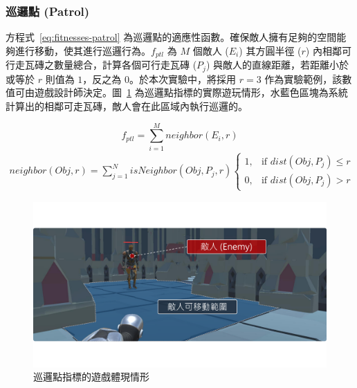 

\subsubsection{巡邏點 (Patrol)}
\label{sssec:method-segments-fitnesses-patrol}

方程式~\ref{eq:fitnesses-patrol} 為巡邏點的適應性函數。確保敵人擁有足夠的空間能夠進行移動，使其進行巡邏行為。$f_{ptl}$ 為 $M$ 個敵人 ($E_{i}$) 其方圓半徑 ($r$) 內相鄰可行走瓦磚之數量總合，計算各個可行走瓦磚 ($P_{j}$) 與敵人的直線距離，若距離小於或等於 $r$ 則值為 $1$，反之為 $0$。於本次實驗中，將採用 $r=3$ 作為實驗範例，該數值可由遊戲設計師決定。圖~\ref{fig:fitnesses-patrol-gameplay} 為巡邏點指標的實際遊玩情形，水藍色區塊為系統計算出的相鄰可走瓦磚，敵人會在此區域內執行巡邏的。

\begin{equation}
    \label{eq:fitnesses-patrol}
    f_{ptl} = \sum_{i=1}^{M} neighbor(E_i, r)
\end{equation}
\begin{gather*}
    neighbor(Obj, r) = \sum_{j=1}^{N} isNeighbor(Obj, P_{j}, r)
      \begin{cases}
        1, & \mbox{if } dist(Obj, P_{j}) \leq r \\
        0, & \mbox{if } dist(Obj, P_{j}) > r
      \end{cases}
\end{gather*}

\begin{figure}[!htb]
  \begin{center}
    \includegraphics[width=1.0\textwidth]{figures/fitnesses-patrol-gameplay.pdf}
    \caption{巡邏點指標的遊戲體現情形}
    \label{fig:fitnesses-patrol-gameplay}
  \end{center}
\end{figure}

